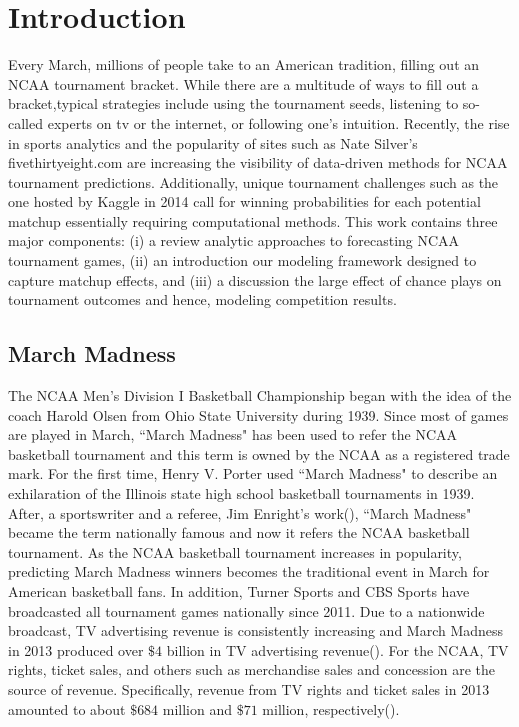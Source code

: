 \section{Introduction}

Every March, millions of people take to an American tradition, filling out an NCAA tournament bracket.  While there are a multitude of ways to fill out a bracket,typical strategies include using the tournament seeds, listening to so-called experts on tv or the internet, or following one's intuition.  Recently, the rise in sports analytics and the popularity of sites such as Nate Silver's fivethirtyeight.com are increasing the visibility of data-driven methods for NCAA tournament predictions.  Additionally, unique tournament challenges such as the one hosted by Kaggle in 2014 call for winning probabilities for each potential matchup essentially requiring computational methods.  This work contains three major components: (i) a review analytic approaches to forecasting NCAA tournament games, (ii) an introduction our modeling framework designed to capture matchup effects, and (iii) a discussion the large effect of chance plays on tournament outcomes and hence, modeling competition results.


\subsection{March Madness}
The NCAA Men's Division I Basketball Championship began with the idea of the coach Harold Olsen from Ohio State University during 1939. Since most of games are played in March, ``March Madness" has been used to refer the NCAA basketball tournament and this term is owned by the NCAA as a registered trade mark.
For the first time, Henry V. Porter used ``March Madness" to describe an exhilaration of the Illinois state high school basketball tournaments in 1939.  After, a sportswriter and a referee, Jim Enright's work(\cite{enright1977march}), ``March Madness" became the term nationally famous and now it refers the NCAA basketball tournament. As the NCAA basketball tournament increases in popularity, predicting March Madness winners becomes the traditional event in March for American basketball fans. In addition, Turner Sports and CBS Sports have broadcasted all tournament games nationally since 2011. Due to a nationwide broadcast, TV advertising revenue is consistently increasing and March Madness in 2013 produced over $\$ 4$ billion in TV advertising revenue(\cite{Kantar2014}). For the NCAA, TV rights, ticket sales, and others such as merchandise sales and concession are the source of revenue. Specifically, revenue from TV rights and ticket sales in 2013 amounted to about $\$ 684$ million and $\$ 71$ million, respectively(\cite{NCAA2014}).

